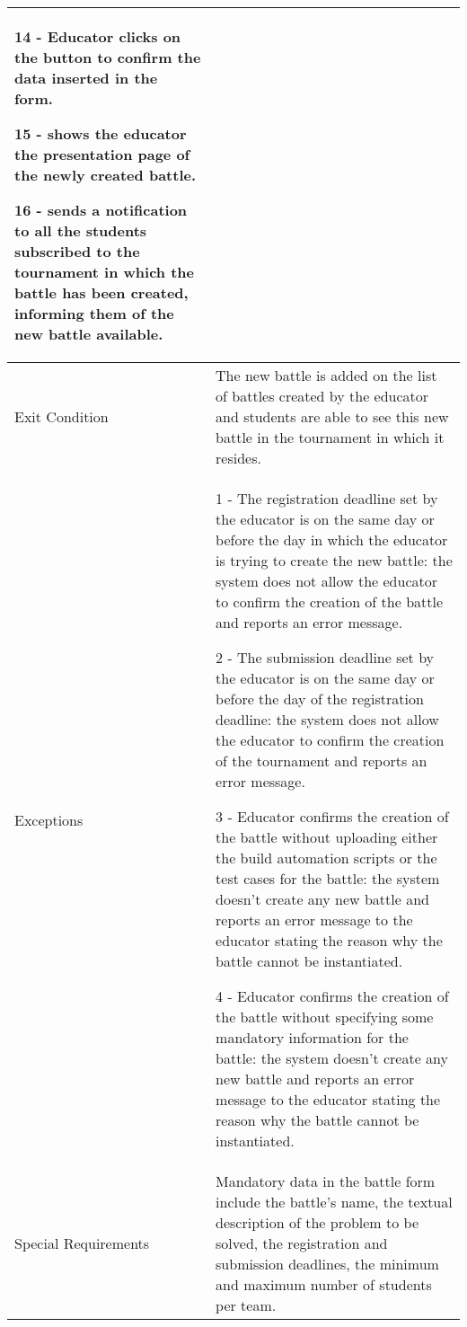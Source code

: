 \begin{longtable}{|p{3cm}p{14cm}|}
        	14 - Educator clicks on the button to confirm the data inserted in the form.
        	
        	15 - \app shows the educator the presentation page of the newly created battle.
        	
        	16 - \app sends a notification to all the students subscribed to the tournament in which the battle has been created, informing them of the new battle available.
        \\
        \hline
        Exit Condition & The new battle is added on the list of battles created by the educator and students are able to see this new battle in the tournament in which it resides. \\
        \hline
        Exceptions & 
        
        1 - The registration deadline set by the educator is on the same day or before the day in which the educator is trying to create the new battle: the system does not allow the educator to confirm the creation of the battle and reports an error message.
        
       	2 - The submission deadline set by the educator is on the same day or before the day of the registration deadline: the system does not allow the educator to confirm the creation of the tournament and reports an error message.
        
        3 - Educator confirms the creation of the battle without uploading either the build automation scripts or the test cases for the battle: the system doesn't create any new battle and reports an error message to the educator stating the reason why the battle cannot be instantiated.
        
        4 - Educator confirms the creation of the battle without specifying some mandatory information for the battle: the system doesn't create any new battle and reports an error message to the educator stating the reason why the battle cannot be instantiated.\\
        \hline
        Special Requirements & Mandatory data in the battle form include the battle's name, the textual description of the problem to be solved, the registration and submission deadlines, the minimum and maximum number of students per team.\\
         \hline
      
    \end{longtable}
      
